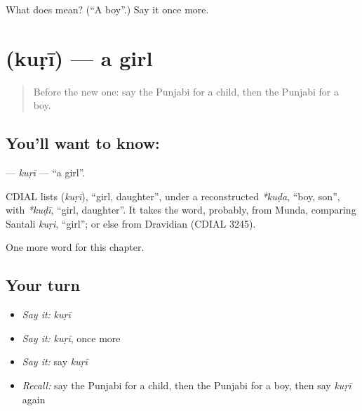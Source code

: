 \begin{tcolorbox}[breakable,colback=teal!4,colframe=teal!35!black,title={Before you move on}]
What does  mean? (\textquotedblleft{}A boy\textquotedblright{}.) Say it once more.
\end{tcolorbox}
\section[\texorpdfstring{\pa{ਕੁੜੀ} (kuṛī)}{ਕੁੜੀ (kuṛī)}]{ (kuṛī) — a girl}

\label{lesson:PA-C55-kuri}



\begin{quote}
Before the new one: say the Punjabi for a child, then the Punjabi for a boy.
\end{quote}

\subsection*{You'll want to know: }
\textbf{} — \emph{kuṛī} — \textquotedblleft{}a girl\textquotedblright{}.

\begin{cousinweb}
CDIAL lists \textbf{} (\emph{kuṛī}), \textquotedblleft{}girl, daughter\textquotedblright{}, under a reconstructed \emph{*kuḍa}, \textquotedblleft{}boy, son\textquotedblright{}, with \emph{*kuḍī}, \textquotedblleft{}girl, daughter\textquotedblright{}. It takes the word, probably, from Munda, comparing Santali \emph{kuṛi}, \textquotedblleft{}girl\textquotedblright{}; or else from Dravidian (CDIAL 3245).
\end{cousinweb}

\begin{grammarlens}[title={What you've built}]
One more word for this chapter.
\end{grammarlens}

\subsection*{Your turn}
\begin{itemize}
\raggedright
  \item \emph{Say it:} \emph{kuṛī}
  \item \emph{Say it:} \emph{kuṛī}, once more
  \item \emph{Say it:} say \emph{kuṛī}
  \item \emph{Recall:} say the Punjabi for a child, then the Punjabi for a boy, then say \emph{kuṛī} again
\end{itemize}

